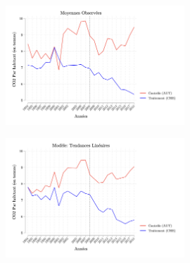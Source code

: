 \begin{figure}[h]
\centering
\includegraphics[width=0.6\textwidth]{Article/images/pt_test_omeans.png}
\caption{}
\label{fig:omeans}
    \end{figure}

\vspace*{0.5cm}

\begin{figure}[h]
\centering
\includegraphics[width=0.6\textwidth]{Article/images/linear_trend_test.png}
\caption{}
\label{fig:pt_test}
    \end{figure}

